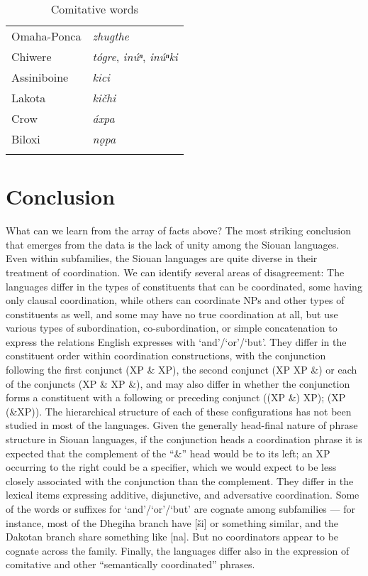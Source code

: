 \documentclass[output=paper]{LSP/langsci}
\begin{document}
\begin{table}
\caption{Comitative words} \label{comitative} 

\begin{tabular} [t]{ l  l  }
\lsptoprule
Omaha-Ponca	& \textit{zhugthe} \\
Chiwere &  \textit{tógre},  \textit{inúⁿ}, \textit{inúⁿki} \\
Assiniboine &  \textit{kici} \\
Lakota & \textit{ki\v{c}hi} \\
Crow & \textit{áxpa} \\
Biloxi & \textit{n\k{o}pa} \\
\lspbottomrule
\end{tabular}
\end{table}

\section{Conclusion}\label{sec:rudin:5}
 
What can we learn from the array of facts above? The most striking conclusion that emerges from the data is the lack of unity among the Siouan languages. Even within subfamilies, the Siouan languages are quite diverse in their treatment of coordination. We can identify several areas of disagreement:  The languages differ in the types of constituents that can be coordinated, some having only clausal coordination, while others can coordinate NPs and other types of constituents as well, and some may have no true
coordination at all, but use various types of subordination, co-subordination, or simple concatenation to express the relations English expresses with `and'/`or'/`but'.  They differ in the constituent order within coordination constructions, with the conjunction following the first conjunct (XP \& XP), the second conjunct (XP XP \&) or each of the conjuncts (XP \& XP \&), and may also differ in whether the conjunction forms a constituent with a following or preceding conjunct ((XP \&) XP); (XP (\&XP)). The hierarchical structure of each of these configurations has not been studied in most of the languages. Given the generally head-final nature of phrase structure in Siouan languages, if the conjunction heads a coordination phrase it is expected that the complement of the ``\&'' head would be to its left; an XP occurring to the right could be a specifier, which we would expect to be less closely associated with the conjunction than the complement.  They differ in the lexical items expressing additive, disjunctive, and adversative coordination. Some of the words or suffixes for `and'/`or'/`but' are cognate among subfamilies --- for instance, most of the Dhegiha branch have [\v{s}i] or something similar, and the Dakotan branch share something like [na]. But no coordinators appear to be cognate across the family.  Finally, the languages differ also in the expression of comitative and other ``semantically coordinated'' phrases.
\end{document}
